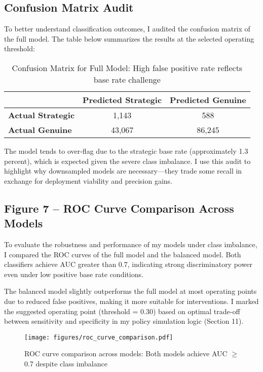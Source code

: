 \subsection{Confusion Matrix Audit}

To better understand classification outcomes, I audited the confusion matrix of the full model. The table below summarizes the results at the selected operating threshold:

\begin{table}[H]
\centering
\caption{Confusion Matrix for Full Model: High false positive rate reflects base rate challenge}
\label{tab:confusion_matrix}
\begin{tabular}{lcc}
\toprule
 & Predicted Strategic & Predicted Genuine \\
\midrule
\textbf{Actual Strategic} & 1,143 & 588 \\
\textbf{Actual Genuine}   & 43,067 & 86,245 \\
\bottomrule
\end{tabular}
\end{table}

The model tends to over-flag due to the strategic base rate (approximately 1.3 percent), which is expected given the severe class imbalance. I use this audit to highlight why downsampled models are necessary—they trade some recall in exchange for deployment viability and precision gains.

\subsection*{Figure 7 -- ROC Curve Comparison Across Models}

To evaluate the robustness and performance of my models under class imbalance, I compared the ROC curves of the full model and the balanced model. Both classifiers achieve AUC greater than 0.7, indicating strong discriminatory power even under low positive base rate conditions.

The balanced model slightly outperforms the full model at most operating points due to reduced false positives, making it more suitable for interventions. I marked the suggested operating point (threshold = 0.30) based on optimal trade-off between sensitivity and specificity in my policy simulation logic (Section 11).

\begin{figure}[H]
\centering
\texttt{[image: figures/roc\_curve\_comparison.pdf]}
\caption{ROC curve comparison across models: Both models achieve AUC $\geq$ 0.7 despite class imbalance}
\label{fig:roc_comparison}
\end{figure}

